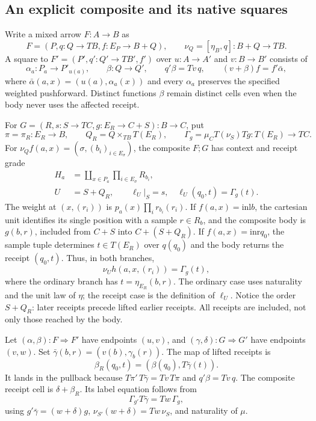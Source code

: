 \documentclass[11pt,a4paper]{article}
\theoremstyle{definition}
\newcommand{\inl}{\mathrm{inl}}
\newcommand{\inr}{\mathrm{inr}}
\begin{document}
\subsection{An explicit composite and its native squares}\label{pc:composition}

Write a mixed arrow $F:A\to B$ as
\[
 F=(P,q:Q\to TB,f:E_P\to B+Q),\qquad
 \nu_Q=[\eta_B,q]:B+Q\to TB.
\]
A square to $F'=(P',q':Q'\to TB',f')$ over
$u:A\to A'$ and $v:B\to B'$ consists of
\[
 \alpha_a:P_a\to P'_{u(a)},\qquad
 \beta:Q\to Q',\qquad q'\beta=Tv\,q,\qquad
 (v+\beta)f=f'\bar\alpha,
\]
where $\bar\alpha(a,x)=(u(a),\alpha_a(x))$ and every $\alpha_a$
preserves the specified weighted pushforward. Distinct functions $\beta$
remain distinct cells even when the body never uses the affected receipt.

For $G=(R,s:S\to TC,g:E_R\to C+S):B\to C$, put
\[
 \pi=\pi_R:E_R\to B,\qquad Q_R=Q\times_{TB}T(E_R),\qquad
 \Gamma_g=\mu_C T(\nu_S)Tg:T(E_R)\to TC.
\]
For $\nu_Q f(a,x)=(\sigma,(b_i)_{i\in E_\sigma})$, the composite
$F;G$ has context and receipt grade
\begin{align*}
 H_a&=\coprod_{x\in P_a}\prod_{i\in E_\sigma}R_{b_i},\\
 U&=S+Q_R,\qquad
 \ell_U|_S=s,\quad \ell_U(q_0,t)=\Gamma_g(t).
\end{align*}
The weight at $(x,(r_i))$ is $p_a(x)\prod_i r_{b_i}(r_i)$.
If $f(a,x)=\inl b$, the cartesian unit identifies its single position
with a sample $r\in R_b$, and the composite body is $g(b,r)$, included
from $C+S$ into $C+(S+Q_R)$. If $f(a,x)=\inr q_0$, the sample tuple
determines $t\in T(E_R)$ over $q(q_0)$ and the body returns the receipt
$(q_0,t)$. Thus, in both branches,
\begin{equation}\label{pc:label-composite}
 \nu_U h(a,x,(r_i))=\Gamma_g(t),
\end{equation}
where the ordinary branch has $t=\eta_{E_R}(b,r)$. The ordinary case
uses naturality and the unit law of $\eta$; the receipt case is the
definition of $\ell_U$. Notice the order $S+Q_R$: later receipts precede
lifted earlier receipts. All receipts are included, not only those reached
by the body.

Let $(\alpha,\beta):F\Rightarrow F'$ have endpoints $(u,v)$, and
$(\gamma,\delta):G\Rightarrow G'$ have endpoints $(v,w)$. Set
$\bar\gamma(b,r)=(v(b),\gamma_b(r))$. The map of lifted receipts is
\begin{equation}\label{pc:lifted-cell}
 \beta_R(q_0,t)=(\beta(q_0),T\bar\gamma(t)).
\end{equation}
It lands in the pullback because
$T\pi'\,T\bar\gamma=Tv\,T\pi$ and $q'\beta=Tv\,q$.
The composite receipt cell is $\delta+\beta_R$. Its label equation follows
from
\begin{equation}\label{pc:label-naturality}
 \Gamma_{g'}T\bar\gamma=Tw\,\Gamma_g,
\end{equation}
using $g'\bar\gamma=(w+\delta)g$,
$\nu_{S'}(w+\delta)=Tw\,\nu_S$, and naturality of $\mu$.
\end{document}
